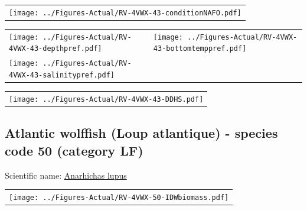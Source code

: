 \documentclass[12pt]{article}\usepackage[]{graphicx}\usepackage[]{color}
\begin{document}
\vspace{1cm}
\begin{minipage}{1.0\textwidth}
 \begin{tabular}{c}
\texttt{[image: ../Figures-Actual/RV-4VWX-43-conditionNAFO.pdf]} \\ 
\end{tabular} 
\end{minipage}
\clearpage
\begin{minipage}{1.0\textwidth}
 \begin{tabular}[t]{m{3in}m{3in}}
\texttt{[image: ../Figures-Actual/RV-4VWX-43-depthpref.pdf]} & 
\texttt{[image: ../Figures-Actual/RV-4VWX-43-bottomtemppref.pdf]} \\ 
\texttt{[image: ../Figures-Actual/RV-4VWX-43-salinitypref.pdf]} & 
 \\ 
\end{tabular} 
\end{minipage}
\newline

\vspace{1cm}
\begin{minipage}{1.0\textwidth}
 \begin{tabular}{c}
\texttt{[image: ../Figures-Actual/RV-4VWX-43-DDHS.pdf]} \\ 
\end{tabular} 
\end{minipage}
\clearpage

\renewcommand\thefigure{\thesubsection\Alph{figure}}

\setcounter{figure}{0}

\hypertarget{sec:50}{%
\subsection{Atlantic wolffish (Loup atlantique) - species code 50 (category LF)}\label{sec:50}}

  


Scientific name: \href{http://www.marinespecies.org/aphia.php?p=taxdetails\&id=126758}{Anarhichas lupus} \newline
\begin{minipage}{1.0\textwidth}
 \begin{tabular}{c}
\texttt{[image: ../Figures-Actual/RV-4VWX-50-IDWbiomass.pdf]} \\ 
\end{tabular} 
\end{minipage}
\newline
\end{document}
